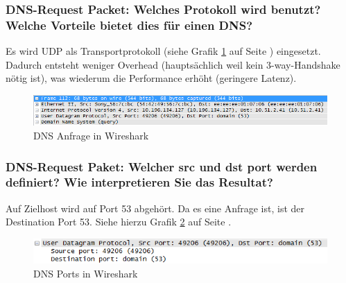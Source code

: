 \documentclass[a4paper,11pt]{scrartcl}
\begin{document}
\subsubsection{DNS-Request Packet: Welches Protokoll wird benutzt? Welche Vorteile bietet
dies für einen DNS?}
Es wird UDP als Transportprotokoll (siehe Grafik \ref{fig:dns_2_2_1} auf Seite \pageref{fig:dns_2_2_1}) eingesetzt. Dadurch entsteht weniger Overhead (hauptsächlich weil kein 3-way-Handshake nötig ist), was wiederum die Performance erhöht (geringere Latenz).
\begin{figure}[h]
	\centering
	\includegraphics[width=1.0\textwidth]{../aufg2/dns_2_2_1.png}
	\caption{DNS Anfrage in Wireshark}
	\label{fig:dns_2_2_1}
\end{figure}

\subsubsection{DNS-Request Paket: Welcher src und dst port werden definiert? Wie interpretieren Sie das Resultat?}
Auf Zielhost wird auf Port 53 abgehört. Da es eine Anfrage ist, ist der Destination Port 53. Siehe hierzu Grafik \ref{fig:dns_2_2_2} auf Seite \pageref{fig:dns_2_2_2}.
\begin{figure}[h]
	\centering
	\includegraphics[width=1.0\textwidth]{../aufg2/dns_2_2_2.png}
	\caption{DNS Ports in Wireshark}
	\label{fig:dns_2_2_2}
\end{figure}

\FloatBarrier
\end{document}
